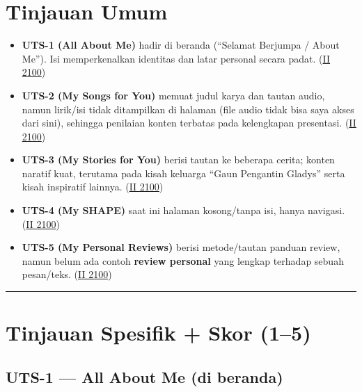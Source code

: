 \documentclass[
  letterpaper,
  DIV=11,
  numbers=noendperiod]{scrreprt}
\providecommand{\tightlist}{%
  \setlength{\itemsep}{0pt}\setlength{\parskip}{0pt}}
\begin{document}
\section{Tinjauan Umum}\label{tinjauan-umum}

\begin{itemize}
\tightlist
\item
  \textbf{UTS-1 (All About Me)} hadir di beranda (``Selamat Berjumpa /
  About Me''). Isi memperkenalkan identitas dan latar personal secara
  padat. (\href{https://ii-2100.github.io/all-about-me/}{II 2100})
\item
  \textbf{UTS-2 (My Songs for You)} memuat judul karya dan tautan audio,
  namun lirik/isi tidak ditampilkan di halaman (file audio tidak bisa
  saya akses dari sini), sehingga penilaian konten terbatas pada
  kelengkapan presentasi.
  (\href{https://ii-2100.github.io/all-about-me/My_Song_for_You/index.html}{II
  2100})
\item
  \textbf{UTS-3 (My Stories for You)} berisi tautan ke beberapa cerita;
  konten naratif kuat, terutama pada kisah keluarga ``Gaun Pengantin
  Gladys'' serta kisah inspiratif lainnya.
  (\href{https://ii-2100.github.io/all-about-me/My_Stories_for_You/index.html}{II
  2100})
\item
  \textbf{UTS-4 (My SHAPE)} saat ini halaman kosong/tanpa isi, hanya
  navigasi.
  (\href{https://ii-2100.github.io/all-about-me/My_Shapes/index.html}{II
  2100})
\item
  \textbf{UTS-5 (My Personal Reviews)} berisi metode/tautan panduan
  review, namun belum ada contoh \textbf{review personal} yang lengkap
  terhadap sebuah pesan/teks.
  (\href{https://ii-2100.github.io/all-about-me/My_Personal_Reviews/index.html}{II
  2100})
\end{itemize}

\begin{center}\rule{0.5\linewidth}{0.5pt}\end{center}

\section{Tinjauan Spesifik + Skor
(1--5)}\label{tinjauan-spesifik-skor-15}

\subsection{UTS-1 --- All About Me (di
beranda)}\label{uts-1-all-about-me-di-beranda}
\end{document}
